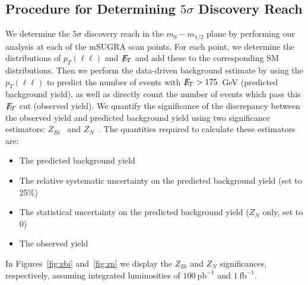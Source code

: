 \subsection{Procedure for Determining $5\sigma$ Discovery Reach}
\label{sec:significance}

We  determine the  $5\sigma$  discovery reach  in the  $m_{0}-m_{1/2}$
plane by  performing our analysis at  each of the  mSUGRA scan points.
For each  point, we  determine the distributions  of $p_{T}(\ell\ell)$
and $E\!\!\!\!/_T$ and add these  to the corresponding SM distributions.  Then
we  perform   the  data-driven   background  estimate  by   using  the
$p_{T}(\ell\ell)$ to predict the  number of events with $E\!\!\!\!/_T>175$~GeV
(predicted background yield), as well  as directly count the number of
events which pass  this $E\!\!\!\!/_T$ cut (observed yield).   We quantify the
significance  of  the  discrepancy  between  the  observed  yield  and
predicted   background  yield   using  two   significance  estimators:
$Z_{Bi}$~\cite{cite:cousins}    and    $Z_N$~\cite{cite:conway}.   The
quantities required to calculate these estimators are:

\begin{itemize}
\item The predicted background yield
\item The relative systematic  uncertainty on the predicted background
yield (set to 25\%)
\item The  statistical uncertainty  on the predicted  background yield
($Z_N$ only, set to 0)
\item The observed yield
\end{itemize}

In   Figures~\ref{fig:zbi} and~\ref{fig:zn} we   display  the
$Z_{Bi}$ and $Z_{N}$  significances, respectively,  assuming    integrated    luminosities   of
$100~\mathrm{pb}^{-1}$  and  $1~\mathrm{fb}^{-1}$.


